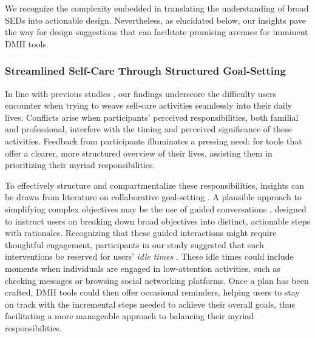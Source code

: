 We recognize the complexity embedded in translating the understanding of broad SEDs into actionable design. Nevertheless, as elucidated below, our insights pave the way for design suggestions that can facilitate promising avenues for imminent DMH tools.





\subsubsection{Streamlined Self-Care Through Structured Goal-Setting}


In line with previous studies \cite{bhattacharjee2022kind, brown2014health}, our findings underscore the difficulty users encounter when trying to weave self-care activities seamlessly into their daily lives. Conflicts arise when participants' perceived responsibilities, both familial and professional, interfere with the timing and perceived significance of these activities. Feedback from participants illuminates a pressing need: for tools that offer a clearer, more structured overview of their lives, assisting them in prioritizing their myriad responsibilities.

To effectively structure and compartmentalize these responsibilities, insights can be drawn from literature on collaborative goal-setting \cite{agapie2022longitudinal, lee2021sticky, hsueh2020exploring}. A plausible approach to simplifying complex objectives may be the use of guided conversations \cite{o2018suddenly, bowman2022pervasive}, designed to instruct users on breaking down broad objectives into distinct, actionable steps with rationales. Recognizing that these guided interactions might require thoughtful engagement, participants in our study suggested that such interventions be reserved for users' \textit{idle times} \cite{poole2013hci}. These idle times could include moments when individuals are engaged in low-attention activities, such as checking messages or browsing social networking platforms. Once a plan has been crafted, DMH tools could then offer occasional reminders, helping users to stay on track with the incremental steps needed to achieve their overall goals, thus facilitating a more manageable approach to balancing their myriad responsibilities.


